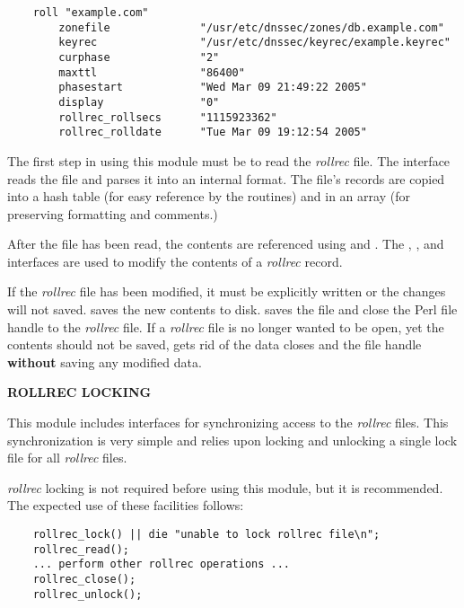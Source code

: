 \begin{verbatim}
    roll "example.com"
        zonefile              "/usr/etc/dnssec/zones/db.example.com"
        keyrec                "/usr/etc/dnssec/keyrec/example.keyrec"
        curphase              "2"
        maxttl                "86400"
        phasestart            "Wed Mar 09 21:49:22 2005"
        display               "0"
        rollrec_rollsecs      "1115923362"
        rollrec_rolldate      "Tue Mar 09 19:12:54 2005"
\end{verbatim}

The first step in using this module must be to read the {\it rollrec} file.
The  interface reads the file and parses it into an
internal format.  The file's records are copied into a hash table (for easy
reference by the  routines) and in an
array (for preserving formatting and comments.)

After the file has been read, the contents are referenced using
 and .  The
, , and 
interfaces
are used to modify the contents of a {\it rollrec} record.

If the {\it rollrec} file has been modified, it must be explicitly written or
the changes will not saved.   saves the new contents to
disk.   saves the file and close the Perl file handle to
the {\it rollrec} file.  If a {\it rollrec} file is no longer wanted to be
open, yet the contents should not be saved,  gets rid
of the data closes and the file handle {\bf without} saving any modified data.

{\bf ROLLREC LOCKING}

This module includes interfaces for synchronizing access to the {\it rollrec}
files.  This synchronization is very simple and relies upon locking and
unlocking a single lock file for all {\it rollrec} files.

{\it rollrec} locking is not required before using this module, but it is
recommended.  The expected use of these facilities follows:

\begin{verbatim}
    rollrec_lock() || die "unable to lock rollrec file\n";
    rollrec_read();
    ... perform other rollrec operations ...
    rollrec_close();
    rollrec_unlock();
\end{verbatim}

